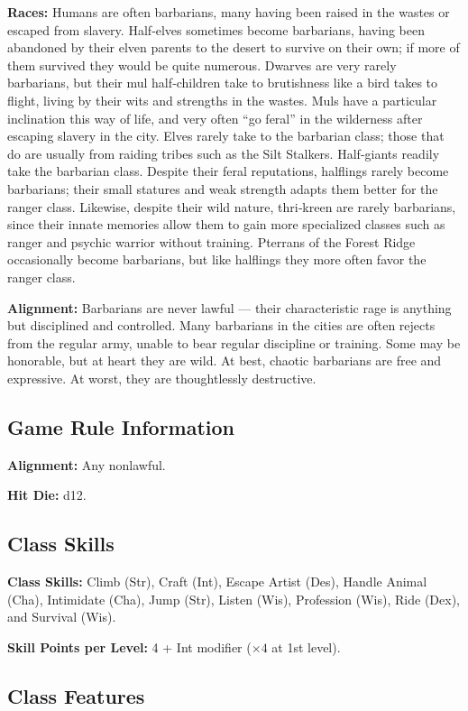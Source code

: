 \textbf{Races:} Humans are often barbarians, many having been raised in the wastes or escaped from slavery. Half‐elves sometimes become barbarians, having been abandoned by their elven parents to the desert to survive on their own; if more of them survived they would be quite numerous. Dwarves are very rarely barbarians, but their mul half‐children take to brutishness like a bird takes to flight, living by their wits and strengths in the wastes. Muls have a particular inclination this way of life, and very often ``go feral'' in the wilderness after escaping slavery in the city. Elves rarely take to the barbarian class; those that do are usually from raiding tribes such as the Silt Stalkers. Half‐giants readily take the barbarian class. Despite their feral reputations, halflings rarely become barbarians; their small statures and weak strength adapts them better for the ranger class. Likewise, despite their wild nature, thri‐kreen are rarely barbarians, since their innate memories allow them to gain more specialized classes such as ranger and psychic warrior without training. Pterrans of the Forest Ridge occasionally become barbarians, but like halflings they more often favor the ranger class.

\textbf{Alignment:} Barbarians are never lawful — their characteristic rage is anything but disciplined and controlled. Many barbarians in the cities are often rejects from the regular army, unable to bear regular discipline or training. Some may be honorable, but at heart they are wild. At best, chaotic barbarians are free and expressive. At worst, they are thoughtlessly destructive.

\subsection{Game Rule Information}
\textbf{Alignment:} Any nonlawful.

\textbf{Hit Die:} d12.

\subsection{Class Skills}
\textbf{Class Skills:} Climb (Str), Craft (Int), Escape Artist (Des), Handle Animal (Cha), Intimidate (Cha), Jump (Str), Listen (Wis), Profession (Wis), Ride (Dex), and Survival (Wis).

\textbf{Skill Points per Level:} 4 + Int modifier ($\times4$ at 1st level).

\subsection{Class Features}

